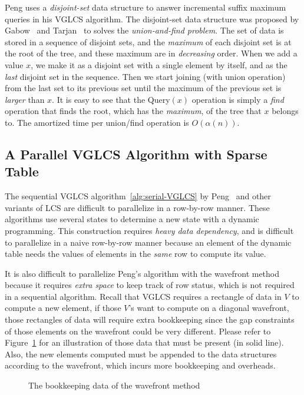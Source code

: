 Peng uses a {\em disjoint-set} data structure to answer incremental
suffix maximum queries in his VGLCS algorithm.  The disjoint-set data
structure was proposed by Gabow~\cite{Gabow1983ALA} and
Tarjan~\cite{Tarjan1975EfficiencyOA} to solves the {\em union-and-find
problem}.  The set of data is stored in a sequence of disjoint sets, and
the {\em maximum} of each disjoint set is at the root of the tree, and
these maximum are in {\em decreasing} order.  When we add a value $x$,
we make it as a disjoint set with a single element by itself, and as the
{\em last} disjoint set in the sequence.  Then we start joining (with
union operation) from the last set to its previous set until the maximum
of the previous set is {\em larger} than $x$. It is easy to see that the
{\sc Query}$(x)$ operation is simply a {\em find} operation that finds the
root, which has the {\em maximum}, of the tree that $x$ belongs to.  The
amortized time per union/find operation is $O(\alpha(n))$.

\subsection{A Parallel VGLCS Algorithm with Sparse Table}

The sequential VGLCS algorithm~\ref{alg:serial-VGLCS} by
Peng~\cite{Peng2011TheLC} and other variants of LCS are difficult to
parallelize in a row-by-row manner.  These algorithms use several
states to determine a new state with a dynamic programming.  This
construction requires {\em heavy data dependency}, and is difficult to
parallelize in a naive row-by-row manner because an element of the
dynamic table needs the values of elements in the {\em same} row to
compute its value.

It is also difficult to parallelize Peng's algorithm with the wavefront
method because it requires {\em extra space} to keep track of row
status, which is not required in a sequential algorithm. Recall that
VGLCS requires a rectangle of data in $V$ to compute a new element, if
those $V$'s want to compute on a diagonal wavefront, those rectangles of
data will require extra bookkeeping since the gap constraints of those
elements on the wavefront could be very different.  Please refer to
Figure~\ref{fig:fig-VGLCS-dp-wavefront} for an illustration of those
data that must be present (in solid line).  Also, the new elements
computed must be appended to the data structures according to the
wavefront, which incurs more bookkeeping and overheads.

\begin{figure}[!thb]
  \centering {} 
  \caption{The bookkeeping data of the wavefront method}
  \label{fig:fig-VGLCS-dp-wavefront}
\end{figure}

